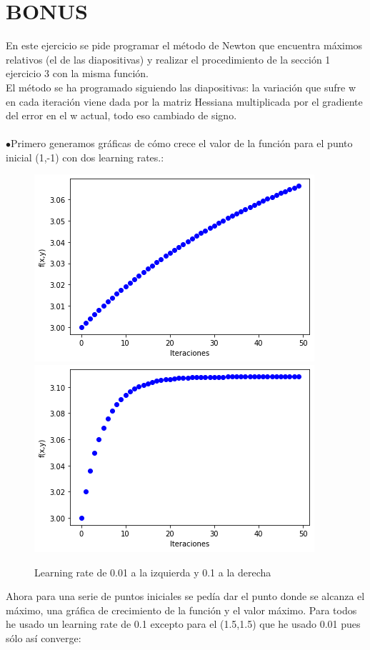 \documentclass[12pt]{article}
\begin{document}
\section{BONUS}
En este ejercicio se pide programar el método de Newton que encuentra máximos relativos (el de las diapositivas) y realizar el procedimiento de la sección 1 ejercicio 3 con la misma función.\\
El método se ha programado siguiendo las diapositivas: la variación que sufre w en cada iteración viene dada por la matriz Hessiana multiplicada por el gradiente del error en el w actual, todo eso cambiado de signo.\\\\
$\bullet$Primero generamos gráficas de cómo crece el valor de la función para el punto inicial (1,-1) con dos learning rates.:\\
\begin{figure}[H]
\centering
\includegraphics[scale=0.45]{Images/MN1-1001.png} 
\includegraphics[scale=0.45]{Images/MN1-101.png} 
\caption{Learning rate de 0.01 a la izquierda y 0.1 a la derecha}
\label{etiqueta}
\end{figure}
Ahora para una serie de puntos iniciales se pedía dar el punto donde se alcanza el máximo, una gráfica de crecimiento de la función y el valor máximo. Para todos he usado un learning rate de 0.1 excepto para el (1.5,1.5) que he usado 0.01 pues sólo así converge:\\
\end{document}
